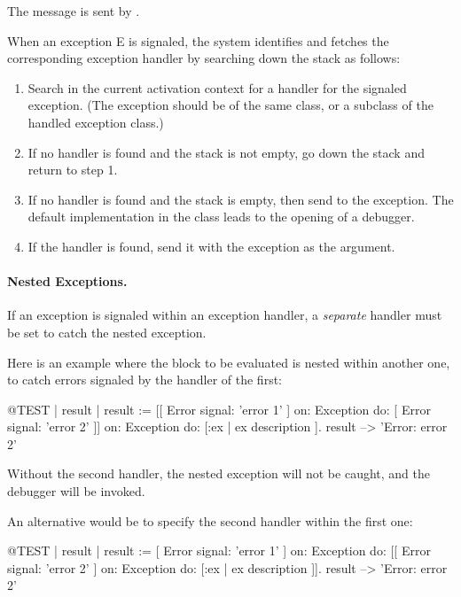 \documentclass[a4paper,10pt,twoside]{book}
\begin{document}
The message  is sent by . 

When an exception E is signaled, the system identifies and fetches the corresponding exception handler by searching down the stack as follows:

\begin{enumerate}

\item Search in the current activation context for a handler for the signaled exception.
(The exception should be of the same class, or a subclass of the handled exception class.)

\item If no handler is found and the stack is not empty, go down the stack and return to step 1.

\item If no handler is found and the stack is empty, then send  to the exception. The default implementation in the  class leads to the opening of a debugger.

\item If the handler is found, send it  with the exception as the argument.

\end{enumerate}

\paragraph{Nested Exceptions.}
If an exception is signaled within an exception handler, a \emph{separate} handler must be set to catch the nested exception.

Here is an example where the block to be evaluated is nested within another one, to catch errors signaled by the handler of the first:
\begin{code}{@TEST | result |}
result := [[ Error signal: 'error 1' ]
	on: Exception
	do: [ Error signal: 'error 2' ]]
		on: Exception
		do: [:ex | ex description ].
result --> 'Error: error 2'
\end{code}

Without the second handler, the nested exception will not be caught, and the debugger will be invoked.

An alternative would be to specify the second handler within the first one:
\begin{code}{@TEST | result |}
result := [ Error signal: 'error 1' ]
	on: Exception
	do: [[ Error signal: 'error 2' ]
		on: Exception
		do: [:ex | ex description ]].
result --> 'Error: error 2'
\end{code}
\end{document}
